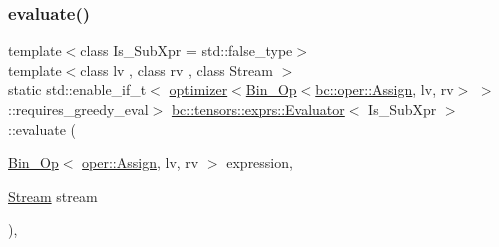 \mbox{\label{classbc_1_1tensors_1_1exprs_1_1Evaluator_abe5caeeb4304b39785a5bb0b9af8d4e2}} 
\subsubsection{\texorpdfstring{evaluate()}{evaluate()}\hspace{0.1cm}{\footnotesize\ttfamily [2/4]}}
{\footnotesize\ttfamily template$<$class Is\+\_\+\+Sub\+Xpr  = std\+::false\+\_\+type$>$ \\
template$<$class lv , class rv , class Stream $>$ \\
static std\+::enable\+\_\+if\+\_\+t$<$ \hyperlink{structbc_1_1tensors_1_1exprs_1_1optimizer}{optimizer}$<$\hyperlink{structbc_1_1tensors_1_1exprs_1_1Bin__Op}{Bin\+\_\+\+Op}$<$\hyperlink{structbc_1_1oper_1_1Assign}{bc\+::oper\+::\+Assign}, lv, rv$>$ $>$\+::requires\+\_\+greedy\+\_\+eval$>$ \hyperlink{classbc_1_1tensors_1_1exprs_1_1Evaluator}{bc\+::tensors\+::exprs\+::\+Evaluator}$<$ Is\+\_\+\+Sub\+Xpr $>$\+::evaluate (\begin{DoxyParamCaption}\item[{\hyperlink{structbc_1_1tensors_1_1exprs_1_1Bin__Op}{Bin\+\_\+\+Op}$<$ \hyperlink{structbc_1_1oper_1_1Assign}{oper\+::\+Assign}, lv, rv $>$}]{expression,  }\item[{\hyperlink{classbc_1_1streams_1_1Stream}{Stream}}]{stream }\end{DoxyParamCaption})\hspace{0.3cm}{\ttfamily [inline]}, {\ttfamily [static]}}

\mbox{\label{classbc_1_1tensors_1_1exprs_1_1Evaluator_a6e25e55959c4a3e33cc50116872c19da}} 
